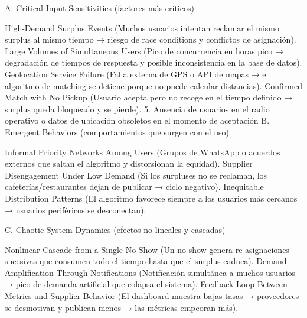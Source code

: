 
A. Critical Input Sensitivities (factores más críticos)

High-Demand Surplus Events
(Muchos usuarios intentan reclamar el mismo surplus al mismo tiempo → riesgo de race conditions y conflictos de asignación).
Large Volumes of Simultaneous Users
(Pico de concurrencia en horas pico → degradación de tiempos de respuesta y posible inconsistencia en la base de datos).
Geolocation Service Failure
(Falla externa de GPS o API de mapas → el algoritmo de matching se detiene porque no puede calcular distancias).
Confirmed Match with No Pickup
(Usuario acepta pero no recoge en el tiempo definido → surplus queda bloqueado y se pierde).
5. Ausencia de usuarios en el radio operativo o datos de ubicación obsoletos en el momento de aceptación
B. Emergent Behaviors (comportamientos que surgen con el uso)

Informal Priority Networks Among Users
(Grupos de WhatsApp o acuerdos externos que saltan el algoritmo y distorsionan la equidad).
Supplier Disengagement Under Low Demand
(Si los surpluses no se reclaman, los cafeterías/restaurantes dejan de publicar → ciclo negativo).
Inequitable Distribution Patterns
(El algoritmo favorece siempre a los usuarios más cercanos → usuarios periféricos se desconectan).

C. Chaotic System Dynamics (efectos no lineales y cascadas)

Nonlinear Cascade from a Single No-Show
(Un no-show genera re-asignaciones sucesivas que consumen todo el tiempo hasta que el surplus caduca).
Demand Amplification Through Notifications
(Notificación simultánea a muchos usuarios → pico de demanda artificial que colapsa el sistema).
Feedback Loop Between Metrics and Supplier Behavior
(El dashboard muestra bajas tasas → proveedores se desmotivan y publican menos → las métricas empeoran más).